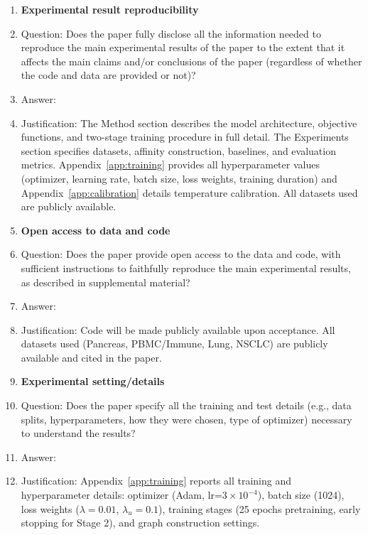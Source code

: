 \begin{enumerate}
\item {\bf Experimental result reproducibility}
    \item[] Question: Does the paper fully disclose all the information needed to reproduce the main experimental results of the paper to the extent that it affects the main claims and/or conclusions of the paper (regardless of whether the code and data are provided or not)?
    \item[] Answer: \answerYes{}
    \item[] Justification: The Method section describes the model architecture, objective functions, and two-stage training procedure in full detail. The Experiments section specifies datasets, affinity construction, baselines, and evaluation metrics. Appendix~\ref{app:training} provides all hyperparameter values (optimizer, learning rate, batch size, loss weights, training duration) and Appendix~\ref{app:calibration} details temperature calibration. All datasets used are publicly available.

\item {\bf Open access to data and code}
    \item[] Question: Does the paper provide open access to the data and code, with sufficient instructions to faithfully reproduce the main experimental results, as described in supplemental material?
    \item[] Answer: \answerNo{}
    \item[] Justification: Code will be made publicly available upon acceptance. All datasets used (Pancreas, PBMC/Immune, Lung, NSCLC) are publicly available and cited in the paper.

\item {\bf Experimental setting/details}
    \item[] Question: Does the paper specify all the training and test details (e.g., data splits, hyperparameters, how they were chosen, type of optimizer) necessary to understand the results?
    \item[] Answer: \answerYes{}
    \item[] Justification: Appendix~\ref{app:training} reports all training and hyperparameter details: optimizer (Adam, lr=$3\times10^{-4}$), batch size (1024), loss weights ($\lambda=0.01$, $\lambda_u=0.1$), training stages (25 epochs pretraining, early stopping for Stage 2), and graph construction settings.


\end{enumerate}
